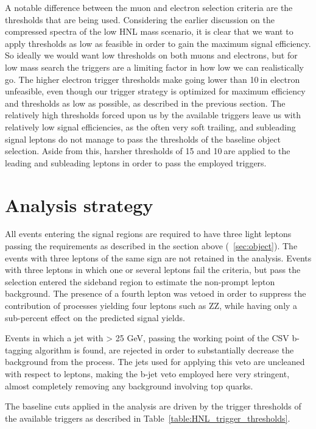 A notable difference between the muon and electron selection criteria
are the \pt thresholds that are being used. Considering the earlier
discussion on the compressed \pt spectra of the low HNL mass scenario, it is
clear that we want to apply \pt thresholds as low as feasible in order
to gain the maximum signal efficiency. So ideally we would want low
\pt thresholds on both muons and electrons, but for low mass search the triggers are a
limiting factor in how low we can realistically go. The higher
electron trigger thresholds make going lower than 10\GeV $\:$in electron \pt unfeasible, even though our trigger strategy is
optimized for maximum efficiency and thresholds as low as possible, as
described in the previous section. The relatively high \pt thresholds forced upon us by the available
triggers leave us with relatively low signal efficiencies, as the
often very soft trailing, and subleading signal leptons do not manage
to pass the thresholds of the baseline object selection.
 Aside from this, harsher \pt thresholds of 15 and 10\GeV $\:$are applied
 to the leading and subleading leptons in order to pass the employed
 triggers.

\section{Analysis strategy}\label{sec:analisi}
All events entering the signal regions are required to have three light leptons passing the \ti requirements as described in the section above (~\ref{sec:object}).
The events with three leptons of the same sign are not retained in the analysis. 
Events with three leptons in which one or several leptons fail the \ti
criteria, but pass the \fo selection entered the sideband region to estimate the non-prompt lepton background. The presence of a fourth \fo lepton was vetoed in order to suppress the contribution of processes yielding four leptons such as ZZ, while having only a sub-percent effect on the predicted signal yields.

Events in which a jet with \pt > 25 GeV, passing the \lo working point of the CSV b-tagging algorithm is found, are rejected in order to substantially decrease the background from the \ttbar process. The jets used for applying this veto are uncleaned with respect to leptons, making the b-jet veto employed here very stringent, almost completely removing any background involving top quarks. 

The baseline \pt cuts applied in the analysis are driven by the
trigger thresholds of the available triggers as described in
Table~\ref{table:HNL_trigger_thresholds}.

